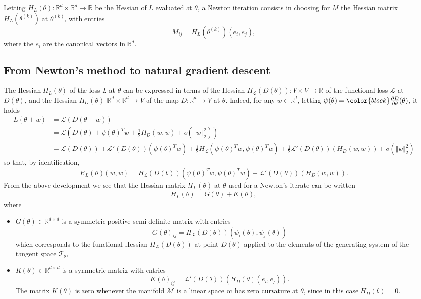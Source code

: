 \documentclass{article}
\theoremstyle{noparens}
\newcommand{\cL}{\mathcal{L}}
\newcommand{\cT}{\mathcal{T}}
\newcommand{\cM}{\mathcal{M}}
\newcommand{\R}{\mathbb{R}}
\newcommand{\colorT}{\color{black}}
\newcommand{\params}{\theta}
\newcommand{\paramk}{\theta^{(k)}}
\newcommand{\dDdp}{{{\colorT \frac{\partial D}{\partial \params}}}}
\begin{document}
Letting $H_L (\theta) : \R^d \times \R^d \to \R$ be the Hessian of $L$ evaluated at $\theta$, a Newton iteration consists in choosing for $M$ the Hessian matrix $H_L(\paramk)$ at $\paramk$, with entries
$$
M_{ij} = H_L(\paramk)(e_i, e_j),
$$
where the $e_i$ are the canonical vectors in  $\R^d$.


\subsection{From Newton's method to natural gradient descent}
\label{sec:gauss-newton}

The Hessian $H_L(\theta) $ of the loss $L$ at $\theta$ can be expressed in terms of
the Hessian $H_{\cL}(D(\theta)) : V \times V \to \R$  of the functional loss $\cL$ at $D(\theta)$, and the Hessian $H_D(\theta) : \R^d \times \R^d \to V$ of the map $D : \R^d\to V$ at $\theta$.  Indeed,
for any
$w\in \R^d$, letting $\psi(\theta) = \dDdp(\theta)$, it holds
\begin{align*}
L(\theta + w)& = \cL( D(\theta + w)) \\
&=\cL( D(\theta) + \psi(\theta)^T w + \frac{1}{2} H_D(w,w) + o(\Vert w\Vert_2^2)) \\
&= \cL( D(\theta)) + \cL'(D(\theta))(\psi(\theta)^T w) + \frac{1}{2} H_{\cL}(\psi(\theta)^T w,\psi(\theta)^T w) + \frac{1}{2} \cL'(D(\theta))(H_D(w,w)) + o(\Vert w\Vert_2^
2)
\end{align*}
so that, by identification,
$$
H_L(\theta)(w,w) =  H_{\cL}(D(\theta))(\psi(\theta)^T w,\psi(\theta)^T w) +    \cL'(D(\theta))(H_D(w,w)) .
$$
From the above development we see that the Hessian matrix $H_L(\theta)$ at $\theta$ used for a  Newton's iterate can be written
\begin{align}
H_L(\theta) = G(\theta) + K(\theta),
 \label{eq:hessian}
\end{align}
where
\begin{itemize}
     \item
$G(\theta) \in \R^{d\times d}$ is a symmetric positive semi-definite matrix with entries
$$
G(\theta)_{ij} = H_\cL(D(\theta))(\psi_i(\theta) , \psi_j(\theta))
$$
which corresponds to the functional Hessian  $H_\cL(D(\theta))$ at point $D(\theta)$ applied to the elements of the generating system of the tangent space $\cT_{\theta}$,
\item  $K(\theta) \in \R^{d\times d}$ is a symmetric matrix with entries
$$
K(\theta)_{ij} =  \cL'(D(\theta))(H_D(\theta)(e_i,e_j)).
$$
The matrix $K(\theta) $ is zero whenever the manifold $\cM$ is a linear space or has zero curvature at $\theta$, since in this case $H_D(\theta)=0$.
\end{itemize}
\end{document}
